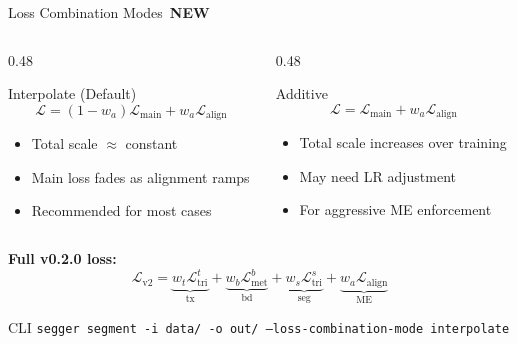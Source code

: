 \documentclass[aspectratio=169,10pt]{beamer}
\newcommand{\Lcal}{\mathcal{L}}
\newcommand{\NEW}{\,{\scriptsize\colorbox{newgreen}{\color{white}\textbf{NEW}}}\,}
\begin{document}
\begin{frame}{Loss Combination Modes \NEW}

\begin{columns}[T]
\begin{column}{0.48\textwidth}
\begin{block}{Interpolate (Default)}
\vspace{-0.2cm}
\[
  \Lcal = (1 - w_a)\Lcal_{\text{main}} + w_a\Lcal_{\text{align}}
\]
{\small
\begin{itemize}\setlength\itemsep{1pt}
  \item Total scale $\approx$ constant
  \item Main loss fades as alignment ramps
  \item Recommended for most cases
\end{itemize}
}
\end{block}
\end{column}
\begin{column}{0.48\textwidth}
\begin{alertblock}{Additive}
\vspace{-0.2cm}
\[
  \Lcal = \Lcal_{\text{main}} + w_a\Lcal_{\text{align}}
\]
{\small
\begin{itemize}\setlength\itemsep{1pt}
  \item Total scale increases over training
  \item May need LR adjustment
  \item For aggressive ME enforcement
\end{itemize}
}
\end{alertblock}
\end{column}
\end{columns}

\vspace{0.15cm}

\textbf{Full v0.2.0 loss:}
\[
  \Lcal_{\text{v2}} = \underbrace{w_t\Lcal_{\text{tri}}^{t}}_{\text{tx}} + \underbrace{w_b\Lcal_{\text{met}}^{b}}_{\text{bd}} + \underbrace{w_s\Lcal_{\text{tri}}^{s}}_{\text{seg}} + \underbrace{w_a\Lcal_{\text{align}}}_{\text{ME}}
\]

\vspace{0.1cm}
\begin{exampleblock}{CLI}
\centering
{\small\texttt{segger segment -i data/ -o out/ --loss-combination-mode interpolate}}
\end{exampleblock}
\end{frame}

\end{document}
